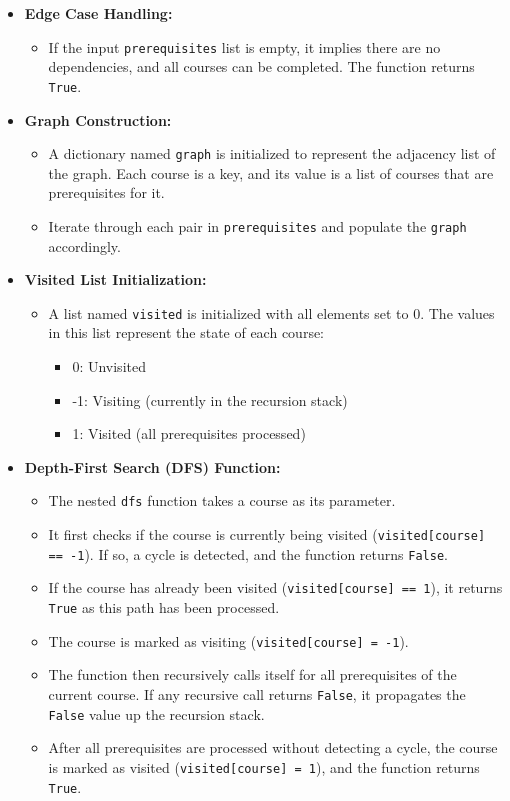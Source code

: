 \begin{itemize}
    \item \textbf{Edge Case Handling:}
    \begin{itemize}
        \item If the input \texttt{prerequisites} list is empty, it implies there are no dependencies, and all courses can be completed. The function returns \texttt{True}.
    \end{itemize}
    
    \item \textbf{Graph Construction:}
    \begin{itemize}
        \item A dictionary named \texttt{graph} is initialized to represent the adjacency list of the graph. Each course is a key, and its value is a list of courses that are prerequisites for it.
        \item Iterate through each pair in \texttt{prerequisites} and populate the \texttt{graph} accordingly.
    \end{itemize}
    
    \item \textbf{Visited List Initialization:}
    \begin{itemize}
        \item A list named \texttt{visited} is initialized with all elements set to 0. The values in this list represent the state of each course:
        \begin{itemize}
            \item 0: Unvisited
            \item -1: Visiting (currently in the recursion stack)
            \item 1: Visited (all prerequisites processed)
        \end{itemize}
    \end{itemize}
    
    \item \textbf{Depth-First Search (DFS) Function:}
    \begin{itemize}
        \item The nested \texttt{dfs} function takes a course as its parameter.
        \item It first checks if the course is currently being visited (\texttt{visited[course] == -1}). If so, a cycle is detected, and the function returns \texttt{False}.
        \item If the course has already been visited (\texttt{visited[course] == 1}), it returns \texttt{True} as this path has been processed.
        \item The course is marked as visiting (\texttt{visited[course] = -1}).
        \item The function then recursively calls itself for all prerequisites of the current course. If any recursive call returns \texttt{False}, it propagates the \texttt{False} value up the recursion stack.
        \item After all prerequisites are processed without detecting a cycle, the course is marked as visited (\texttt{visited[course] = 1}), and the function returns \texttt{True}.
    \end{itemize}
    

\end{itemize}
